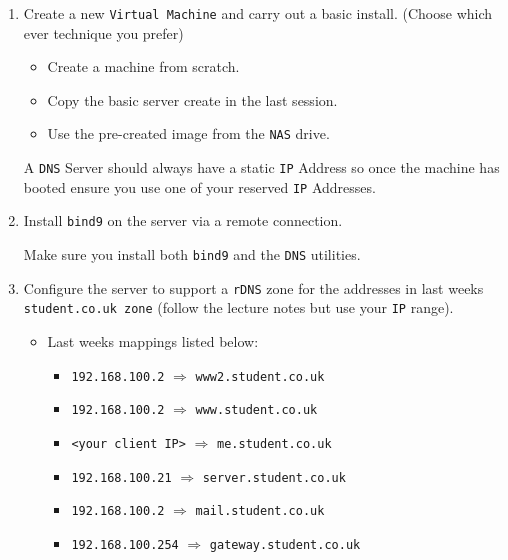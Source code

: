 \documentclass[11pt]{article}
\begin{document}
\begin{enumerate}
    \item Create a new \texttt{Virtual Machine} and carry out a basic install. (Choose which ever technique you prefer)
        \begin{itemize}
            \item Create a machine from scratch.
            \item Copy the basic server create in the last session.
            \item Use the pre-created image from the \texttt{NAS} drive.
        \end{itemize}
        \begin{tcolorbox}[title={\textbf{NOTE:}}]
            A \texttt{DNS} Server should always have a static \texttt{IP} Address so once the machine has booted ensure you use one of your reserved \texttt{IP} Addresses.
        \end{tcolorbox}
    \item Install \texttt{bind9} on the server via a remote connection. 
        \begin{tcolorbox}[title={\textbf{NOTE:}}]
            Make sure you install both \texttt{bind9} and the \texttt{DNS} utilities. 
        \end{tcolorbox}
    \item Configure the server to support a \texttt{rDNS} zone for the addresses in last weeks \texttt{student.co.uk zone} (follow the lecture notes but use your \texttt{IP} range).
        \begin{itemize}
            \item Last weeks mappings listed below:
            \begin{itemize}
                \item \texttt{192.168.100.2} $\Rightarrow$ \texttt{www2.student.co.uk}
                \item \texttt{192.168.100.2} $\Rightarrow$ \texttt{www.student.co.uk}
                \item \texttt{<your client IP>} $\Rightarrow$ \texttt{me.student.co.uk}
                \item \texttt{192.168.100.21} $\Rightarrow$ \texttt{server.student.co.uk}
                \item \texttt{192.168.100.2} $\Rightarrow$ \texttt{mail.student.co.uk}
                \item \texttt{192.168.100.254} $\Rightarrow$ \texttt{gateway.student.co.uk}
            \end{itemize}

\end{itemize}
\end{enumerate}
\end{document}
